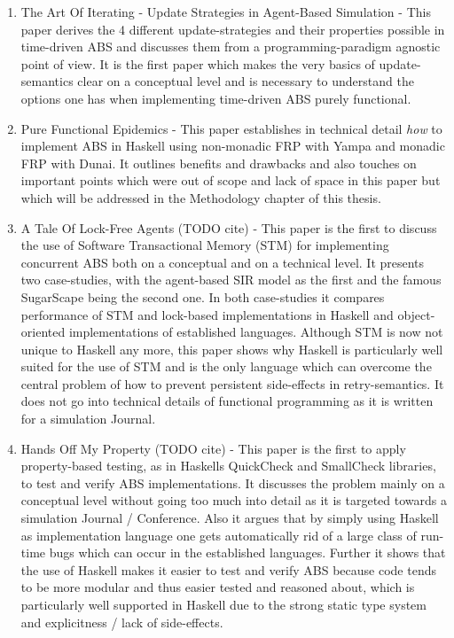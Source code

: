 \begin{enumerate}
	\item The Art Of Iterating - Update Strategies in Agent-Based Simulation \cite{thaler_art_2017} - This paper derives the 4 different update-strategies and their properties possible in time-driven ABS and discusses them from a programming-paradigm agnostic point of view. It is the first paper which makes the very basics of update-semantics clear on a conceptual level and is necessary to understand the options one has when implementing time-driven ABS purely functional.
	
	\item Pure Functional Epidemics \cite{thaler_pure_2019} - This paper establishes in technical detail \textit{how} to implement ABS in Haskell using non-monadic FRP with Yampa and monadic FRP with Dunai. It outlines benefits and drawbacks and also touches on important points which were out of scope and lack of space in this paper but which will be addressed in the Methodology chapter of this thesis.
	
	\item A Tale Of Lock-Free Agents (TODO cite) - This paper is the first to discuss the use of Software Transactional Memory (STM) for implementing concurrent ABS both on a conceptual and on a technical level. It presents two case-studies, with the agent-based SIR model as the first and the famous SugarScape being the second one. In both case-studies it compares performance of STM and lock-based implementations in Haskell and object-oriented implementations of established languages. Although STM is now not unique to Haskell any more, this paper shows why Haskell is particularly well suited for the use of STM and is the only language which can overcome the central problem of how to prevent persistent side-effects in retry-semantics. It does not go into technical details of functional programming as it is written for a simulation Journal.

	\item Hands Off My Property (TODO cite) - This paper is the first to apply property-based testing, as in Haskells QuickCheck and SmallCheck libraries, to test and verify ABS implementations. It discusses the problem mainly on a conceptual level without going too much into detail as it is targeted towards a simulation Journal / Conference. Also it argues that by simply using Haskell as implementation language one gets automatically rid of a large class of run-time bugs which can occur in the established languages. Further it shows that the use of Haskell makes it easier to test and verify ABS because code tends to be more modular and thus easier tested and reasoned about, which is particularly well supported in Haskell due to the strong static type system and explicitness / lack of side-effects.
	

\end{enumerate}
